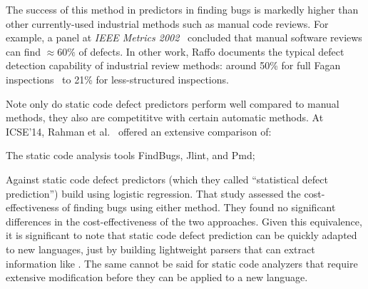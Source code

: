 The success of this method in  predictors in finding bugs is   markedly
higher than other currently-used
industrial
methods such as manual code reviews. For example, 
a  panel at {\em IEEE Metrics
2002}~\cite{shu02} concluded that manual software  reviews can find ${\approx}60\%$ 
of defects.
In other work, 
Raffo documents the typical    defect detection capability of
industrial review methods:   around 50\%
 for full Fagan inspections~\cite{fagan76} to
21\% for less-structured inspections.

Note only do static code defect predictors perform well compared to manual methods,
they also are competititve with certain automatic methods.
At ICSE'14, Rahman et al.~\cite{rahman14:icse} offered an extensive comparison of:
\bi
\item The static code analysis tools FindBugs, Jlint, and Pmd;
\item Against static code defect predictors
(which they called ``statistical defect prediction'') build using logistic regression.
\ei
That study assessed the cost-effectiveness of finding bugs using either method.
They found   no significant differences in the cost-effectiveness
of the two approaches. Given this equivalence, it is significant to note that 
static code defect prediction can be quickly adapted to new languages, just by building lightweight
parsers that can extract information like . The same cannot be said for   static code analyzers that require extensive modification before they can be applied to a new
language.

